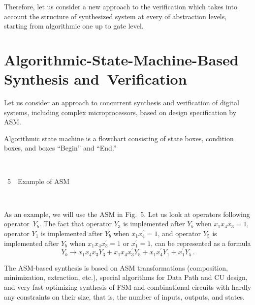 \begin{multicols}{2}
Therefore, let us consider a new approach to the verification
which takes into account the structure of
synthesized system at every of abstraction levels, starting from algorithmic one up to gate level.

\vspace*{-6pt}

\section{Algorithmic-State-Machine-Based Synthesis and~Verification} %

    \noindent
Let us consider an approach to concurrent synthesis and verification of digital systems, including complex
microprocessors, based on design specification by ASM.

Algorithmic state machine is a flowchart consisting
of state boxes, condition boxes, and boxes ``Begin'' and ``End.''

\medskip

\begin{center}
\mbox{%
\epsfxsize=80mm %
}
\end{center}
\vspace*{3pt}
\centerline{{\figurename~5}\ \ \small{Example of ASM}}

\ \\

\bigskip
\addtocounter{figure}{1}


As an example, we will use the ASM in Fig.~5. Let
us look at operators following operator~$Y_b$.
The fact that operator $Y_3$ is
 implemented after $Y_b$ when $x_1x_4x_3 = 1$, operator $Y_1$ is   
implemented
after $Y_b$ when $x_1x^\prime_4 = 1$,
and operator $Y_5$ is implemented after $Y_b$ when $x_1x_4x^\prime_3 =1$
or $x^\prime_1 = 1$, can be represented as a formula
\begin{equation}
Y_b \rightarrow x_1x_4x_3Y_3 + x_1x_4x^\prime_3Y_5 + x_1x^\prime_4Y_1 + x^\prime_1Y_5\,.
\label{e1bar}
\end{equation}

    The ASM-based synthesis is based on ASM transformations (composition, minimization, extraction, etc.),
special algorithms for Data Path and CU
design, and very fast optimizing synthesis of FSM and
combinational circuits with hardly any constraints on their size, that is,
the number of inputs, outputs, and states.


\end{multicols}
